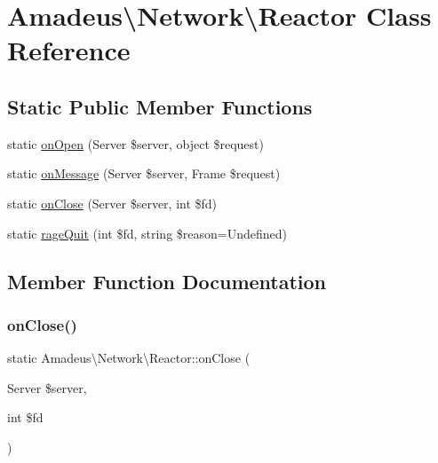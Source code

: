 \hypertarget{classAmadeus_1_1Network_1_1Reactor}{}\section{Amadeus\textbackslash{}Network\textbackslash{}Reactor Class Reference}
\label{classAmadeus_1_1Network_1_1Reactor}
\subsection*{Static Public Member Functions}
\begin{DoxyCompactItemize}
\item 
static \hyperlink{classAmadeus_1_1Network_1_1Reactor_a220cc37741ddaa2967d94e15356cb80b}{on\+Open} (Server \$server, object \$request)
\item 
static \hyperlink{classAmadeus_1_1Network_1_1Reactor_aea9f98b5f7beb51c875dc7db21e1dfc5}{on\+Message} (Server \$server, Frame \$request)
\item 
static \hyperlink{classAmadeus_1_1Network_1_1Reactor_a972b704eec9bc53416f682833aab9fbc}{on\+Close} (Server \$server, int \$fd)
\item 
static \hyperlink{classAmadeus_1_1Network_1_1Reactor_aad07620fd7a3053c524584ae5d89f74f}{rage\+Quit} (int \$fd, string \$reason=\textquotesingle{}Undefined\textquotesingle{})
\end{DoxyCompactItemize}


\subsection{Member Function Documentation}
\mbox{\label{classAmadeus_1_1Network_1_1Reactor_a972b704eec9bc53416f682833aab9fbc}} 
\subsubsection{\texorpdfstring{on\+Close()}{onClose()}}
{\footnotesize\ttfamily static Amadeus\textbackslash{}\+Network\textbackslash{}\+Reactor\+::on\+Close (\begin{DoxyParamCaption}\item[{Server}]{\$server,  }\item[{int}]{\$fd }\end{DoxyParamCaption})\hspace{0.3cm}{\ttfamily [static]}}


